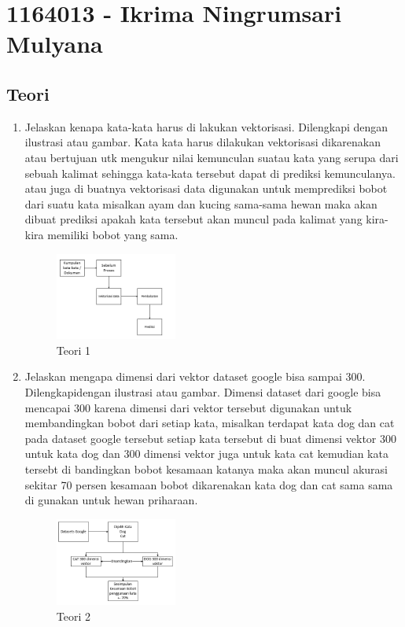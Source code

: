 \section{1164013 - Ikrima Ningrumsari Mulyana}
\subsection{Teori}
\begin{enumerate}
	\item Jelaskan kenapa kata-kata harus di lakukan vektorisasi. Dilengkapi dengan ilustrasi atau gambar.
	\hfill\break
	Kata kata harus dilakukan vektorisasi dikarenakan atau bertujuan utk mengukur nilai kemunculan suatau kata yang serupa dari sebuah kalimat sehingga kata-kata tersebut dapat di prediksi kemunculanya. atau juga di buatnya vektorisasi data digunakan untuk memprediksi bobot dari suatu kata misalkan ayam dan kucing sama-sama hewan maka akan dibuat prediksi apakah kata tersebut akan muncul pada kalimat yang kira-kira memiliki bobot yang sama.
	\hfill\break
	\begin{figure}[H]
		\includegraphics[width=4cm]{figures/1164013/5/1.png}
		\centering
		\caption{Teori 1}
	\end{figure}

	\item Jelaskan mengapa dimensi dari vektor dataset google bisa sampai 300. Dilengkapidengan ilustrasi atau gambar.
	\hfill\break
	Dimensi dataset dari google bisa mencapai 300 karena dimensi dari vektor tersebut digunakan untuk membandingkan bobot dari setiap kata, misalkan terdapat kata dog dan cat pada dataset google tersebut setiap kata tersebut di buat dimensi vektor 300 untuk kata dog dan 300 dimensi vektor juga untuk kata cat kemudian kata tersebt di bandingkan bobot kesamaan katanya maka akan muncul akurasi sekitar 70 persen kesamaan bobot dikarenakan kata dog dan cat sama sama di gunakan untuk hewan priharaan.
	\hfill\break
	\begin{figure}[H]
		\includegraphics[width=4cm]{figures/1164013/5/2.png}
		\centering
		\caption{Teori 2}
	\end{figure}


\end{enumerate}
